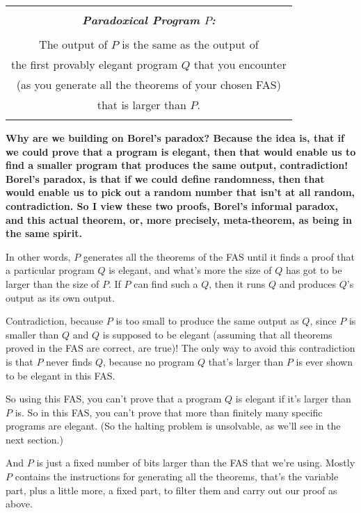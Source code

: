 \documentclass[12pt]{book}
\begin{document}
\begin{center}
\begin{tabular}{|c|}
\hline
\\
\textbf{\emph{\large Paradoxical Program $P$:}}
\\ \\
The output of $P$ is the same as the output of   
\\
the first provably elegant program $Q$ that you encounter
\\
(as you generate all the theorems of your chosen FAS) 
\\
that is larger than $P$.
\\
\\
\hline
\end{tabular}
\end{center}
 
\textbf{Why are we building on Borel's paradox?  Because the idea is, that if we could prove
that a program is elegant, then that would enable us to find a smaller program that
produces the same output, contradiction!  Borel's paradox, is that if we could define
randomness, then that would enable us to pick out a random number that isn't at all random,
contradiction. So I view these two proofs, Borel's informal paradox, and this actual
theorem, or, more precisely, meta-theorem, as being in the same spirit.}
 
In other words, $P$ generates all the theorems of the FAS until it finds a proof that
a particular program $Q$ is elegant, and what's more the size of $Q$ has got to be larger than
the size of $P$.  If $P$ can find such a $Q$, then it runs $Q$ and produces $Q$'s output as its own output.
 
Contradiction, because
$P$ is too small to produce the same output as $Q$, since $P$ is smaller than $Q$ and
$Q$ is supposed to be elegant (assuming that all theorems proved in the FAS are correct, are true)!
The only way to avoid this contradiction is that $P$ never finds $Q$, because no program $Q$ that's
larger than $P$ is ever shown to be elegant in this FAS.
 
So using this FAS, you can't prove that a program $Q$ is elegant if it's larger than $P$ is.
So in this FAS, you can't prove that more than finitely many specific programs are elegant. 
(So the halting problem is unsolvable, as we'll see in the next section.)
 
And $P$ is just a fixed number of bits larger than the FAS that we're using.
Mostly $P$ contains the instructions for generating all the theorems, that's the variable part,
plus a little
more, a fixed part, to filter them and carry out our proof as above.
 
\end{document}
